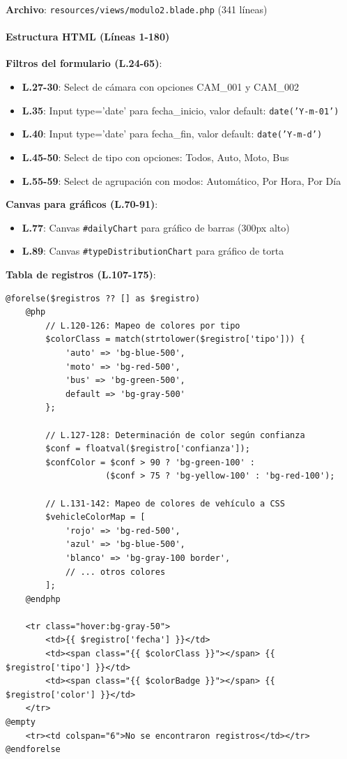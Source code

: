 \textbf{Archivo}: \texttt{resources/views/modulo2.blade.php} (341 líneas)

\paragraph{Estructura HTML (Líneas 1-180)}

\textbf{Filtros del formulario (L.24-65)}:
\begin{itemize}
    \item \textbf{L.27-30}: Select de cámara con opciones CAM\_001 y CAM\_002
    \item \textbf{L.35}: Input type='date' para fecha\_inicio, valor default: \texttt{date('Y-m-01')}
    \item \textbf{L.40}: Input type='date' para fecha\_fin, valor default: \texttt{date('Y-m-d')}
    \item \textbf{L.45-50}: Select de tipo con opciones: Todos, Auto, Moto, Bus
    \item \textbf{L.55-59}: Select de agrupación con modos: Automático, Por Hora, Por Día
\end{itemize}

\textbf{Canvas para gráficos (L.70-91)}:
\begin{itemize}
    \item \textbf{L.77}: Canvas \texttt{\#dailyChart} para gráfico de barras (300px alto)
    \item \textbf{L.89}: Canvas \texttt{\#typeDistributionChart} para gráfico de torta
\end{itemize}

\textbf{Tabla de registros (L.107-175)}:
\begin{lstlisting}[style=phpstyle, caption={Loop de Detecciones - modulo2.blade.php}]
@forelse($registros ?? [] as $registro)
    @php
        // L.120-126: Mapeo de colores por tipo
        $colorClass = match(strtolower($registro['tipo'])) {
            'auto' => 'bg-blue-500',
            'moto' => 'bg-red-500',
            'bus' => 'bg-green-500',
            default => 'bg-gray-500'
        };
        
        // L.127-128: Determinación de color según confianza
        $conf = floatval($registro['confianza']);
        $confColor = $conf > 90 ? 'bg-green-100' : 
                    ($conf > 75 ? 'bg-yellow-100' : 'bg-red-100');
        
        // L.131-142: Mapeo de colores de vehículo a CSS
        $vehicleColorMap = [
            'rojo' => 'bg-red-500',
            'azul' => 'bg-blue-500',
            'blanco' => 'bg-gray-100 border',
            // ... otros colores
        ];
    @endphp
    
    <tr class="hover:bg-gray-50">
        <td>{{ $registro['fecha'] }}</td>
        <td><span class="{{ $colorClass }}"></span> {{ $registro['tipo'] }}</td>
        <td><span class="{{ $colorBadge }}"></span> {{ $registro['color'] }}</td>
    </tr>
@empty
    <tr><td colspan="6">No se encontraron registros</td></tr>
@endforelse
\end{lstlisting}


